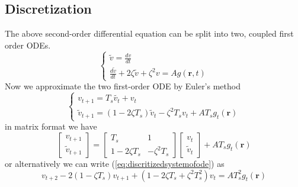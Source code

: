 \documentclass[a4paper,10pt]{article}
\begin{document}
\subsection*{Discretization}
The above second-order differential equation can be split into two, coupled
first order ODEs.\\
\begin{equation}\label{eq:systemofode}
\begin{cases}
\tilde{v}=\frac{dv}{dt} \\
\frac{d\tilde{v}}{dt}+2\zeta\tilde{v}+\zeta^2v=Ag\left( \mathbf{r},t \right)
\end{cases}
\end{equation}
Now we approximate the two first-order ODE by Euler's method
\begin{equation}\label{eq:discritizedsystemofode}
\begin{cases}
v_{t+1}=T_s\tilde{v_t}+v_t\\
\tilde{v}_{t+1}=(1-2\zeta T_s)\tilde{v}_t-\zeta^2T_sv_t+AT_sg_t\left(
\mathbf{r}\right)
\end{cases}
\end{equation}
in matrix format we have
\begin{equation}
 \begin{bmatrix}v_{t+1} \\ \tilde{v}_{t+1}\end{bmatrix}= \begin{bmatrix} T_s
&1\\ 1-2\zeta T_s & -\zeta^2T_s\end{bmatrix}\begin{bmatrix}v_{t} \\
\tilde{v}_{t}\end{bmatrix}+AT_sg_t\left( \mathbf{r}\right)
\end{equation}
or alternatively we can write (\ref{eq:discritizedsystemofode}) as
\begin{equation}\label{eq:DifferenceModel}
 v_{t+2}-2(1-\zeta T_s)v_{t+1}+(1-2\zeta T_s+\zeta^2T_s^2)v_t=AT_s^2g_t\left(
\mathbf{r}\right)
\end{equation}
\end{document}
